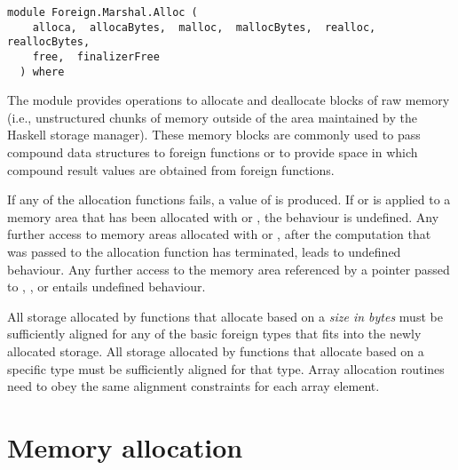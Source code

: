 \label{module:Foreign.Marshal.Alloc}
\haddockbeginheader
{\haddockverb\begin{verbatim}
module Foreign.Marshal.Alloc (
    alloca,  allocaBytes,  malloc,  mallocBytes,  realloc,  reallocBytes, 
    free,  finalizerFree
  ) where\end{verbatim}}
\haddockendheader

The module  provides operations to allocate and
deallocate blocks of raw memory (i.e., unstructured chunks of memory
outside of the area maintained by the Haskell storage manager).  These
memory blocks are commonly used to pass compound data structures to
foreign functions or to provide space in which compound result values
are obtained from foreign functions.
\par
If any of the allocation functions fails, a value of  is
produced.  If  or  is applied to a memory area
that has been allocated with  or , the
behaviour is undefined.  Any further access to memory areas allocated with
 or , after the computation that was passed to
the allocation function has terminated, leads to undefined behaviour.  Any
further access to the memory area referenced by a pointer passed to
, , or  entails undefined
behaviour.
\par
All storage allocated by functions that allocate based on a \emph{size in bytes}
must be sufficiently aligned for any of the basic foreign types
that fits into the newly allocated storage. All storage allocated by
functions that allocate based on a specific type must be sufficiently
aligned for that type. Array allocation routines need to obey the same
alignment constraints for each array element.
\par

\section{Memory allocation
}

